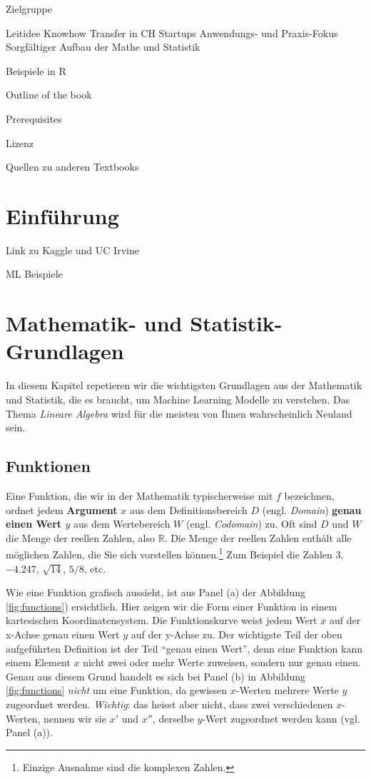 \documentclass[
]{book}
\begin{document}
Zielgruppe

Leitidee
Knowhow Transfer in CH Startups
Anwendungs- und Praxis-Fokus
Sorgfältiger Aufbau der Mathe und Statistik

Beispiele in R

Outline of the book

Prerequisites

Lizenz

Quellen zu anderen Textbooks

\hypertarget{intro}{%
\chapter{Einführung}\label{intro}}

Link zu Kaggle und UC Irvine

ML Beispiele

\hypertarget{basics}{%
\chapter{Mathematik- und Statistik-Grundlagen}\label{basics}}

In diesem Kapitel repetieren wir die wichtigsten Grundlagen aus der Mathematik und Statistik, die es braucht, um Machine Learning Modelle zu verstehen. Das Thema \emph{Lineare Algebra} wird für die meisten von Ihnen wahrscheinlich Neuland sein.

\hypertarget{funktionen}{%
\section{Funktionen}\label{funktionen}}

Eine Funktion, die wir in der Mathematik typischerweise mit \(f\) bezeichnen, ordnet jedem \textbf{Argument} \(x\) aus dem Definitionsbereich \(D\) (engl. \emph{Domain}) \textbf{genau einen Wert \(y\)} aus dem Wertebereich \(W\) (engl. \emph{Codomain}) zu. Oft sind \(D\) und \(W\) die Menge der reellen Zahlen, also \(\mathbb{R}\). Die Menge der reellen Zahlen enthält alle möglichen Zahlen, die Sie sich vorstellen können.\footnote{Einzige Ausnahme sind die komplexen Zahlen.} Zum Beispiel die Zahlen \(3\), \(-4.247\), \(\sqrt{14}\), \(5/8\), etc.

Wie eine Funktion grafisch aussieht, ist aus Panel (a) der Abbildung \ref{fig:functions}) ersichtlich. Hier zeigen wir die Form einer Funktion in einem kartesischen Koordinatensystem. Die Funktionskurve weist jedem Wert \(x\) auf der x-Achse genau einen Wert \(y\) auf der y-Achse zu. Der wichtigste Teil der oben aufgeführten Definition ist der Teil ``genau einen Wert'', denn eine Funktion kann einem Element \(x\) nicht zwei oder mehr Werte zuweisen, sondern nur genau einen. Genau aus diesem Grund handelt es sich bei Panel (b) in Abbildung \ref{fig:functions} \emph{nicht} um eine Funktion, da gewissen \(x\)-Werten mehrere Werte \(y\) zugeordnet werden. \emph{Wichtig}: das heisst aber nicht, dass zwei verschiedenen \(x\)-Werten, nennen wir sie \(x'\) und \(x''\), derselbe \(y\)-Wert zugeordnet werden kann (vgl. Panel (a)).
\end{document}
